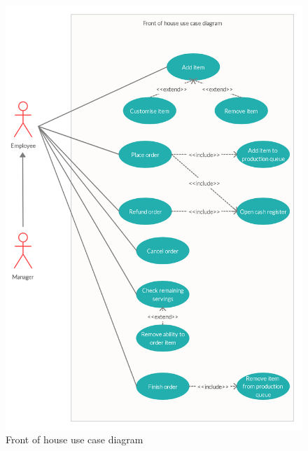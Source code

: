 \begin{figure}[H]
	\centering
	\includegraphics[width=145mm]{images/FOH_UCD.png}
	\caption{Front of house use case diagram}
\end{figure}

